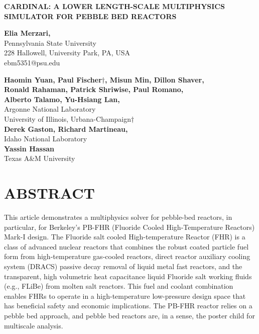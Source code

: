\documentclass[11pt,letterpaper,english]{article}
\begin{document}
\vspace*{-0.45in}
\begin{center}
{\Large\centering\bf CARDINAL: A LOWER LENGTH-SCALE MULTIPHYSICS SIMULATOR FOR PEBBLE BED REACTORS}

\vspace{3pt}

{\bf \large Elia Merzari,} \\
\large Pennsylvania State University \\
\large 228 Hallowell, University Park, PA, USA \\
{\color{brown} ebm5351@psu.edu} \\

\vspace{0.25in}

{\bf \large Haomin Yuan, Paul Fischer$\dagger$, Misun Min, Dillon Shaver,} \\
{\bf \large Ronald Rahaman, Patrick Shriwise, Paul Romano, } \\
{\bf \large Alberto Talamo, Yu-Hsiang Lan, } \\
\large Argonne National Laboratory \\
\large University of Illinois, Urbana-Champaign$\dagger$\\
\vspace{0.25in}
{\bf \large Derek Gaston, Richard Martineau,} \\
\large Idaho National Laboratory \\
\vspace{0.25in}
{\bf \large  Yassin Hassan } \\
\large Texas A\&M University \\

\end{center}



\normalsize

\section*{ABSTRACT}

This article demonstrates a multiphysics solver for pebble-bed reactors, in particular, for Berkeley's PB-FHR (Fluoride Cooled High-Temperature Reactors) Mark-I design. The Fluoride salt cooled High-temperature Reactor (FHR) is a class of advanced nuclear reactors that combines the robust coated particle fuel form from high-temperature gas-cooled reactors, direct reactor auxiliary cooling system (DRACS) passive decay removal of liquid metal fast reactors, and the transparent, high volumetric heat capacitance liquid Fluoride salt working fluids (e.g., FLiBe) from molten salt reactors. This fuel and coolant combination enables FHRs to operate in a high-temperature low-pressure design space that has beneficial safety and economic implications. The PB-FHR reactor relies on a pebble bed approach, and pebble bed reactors are, in a sense, the poster child for multiscale analysis.
\end{document}
